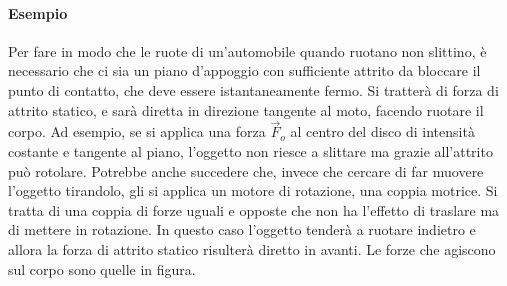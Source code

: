 \documentclass[10pt,a4paper]{book}
\begin{document}
\paragraph{Esempio} Per fare in modo che le ruote di un'automobile quando ruotano non slittino, è necessario che ci sia un piano d'appoggio con sufficiente attrito da bloccare il punto di contatto, che deve essere istantaneamente fermo. Si tratterà di forza di attrito statico, e sarà diretta in direzione tangente al moto, facendo ruotare il corpo. Ad esempio, se si applica una forza $\vec{F}_o$ al centro del disco di intensità costante e tangente al piano, l'oggetto non riesce a slittare ma grazie all'attrito può rotolare. Potrebbe anche succedere che, invece che cercare di far muovere l'oggetto tirandolo, gli si applica un motore di rotazione, una coppia motrice. Si tratta di una coppia di forze uguali e opposte che non ha l'effetto di traslare ma di mettere in rotazione. In questo caso l'oggetto tenderà a ruotare indietro e allora la forza di attrito statico risulterà diretto in avanti. Le forze che agiscono sul corpo sono quelle
in figura.
\end{document}
